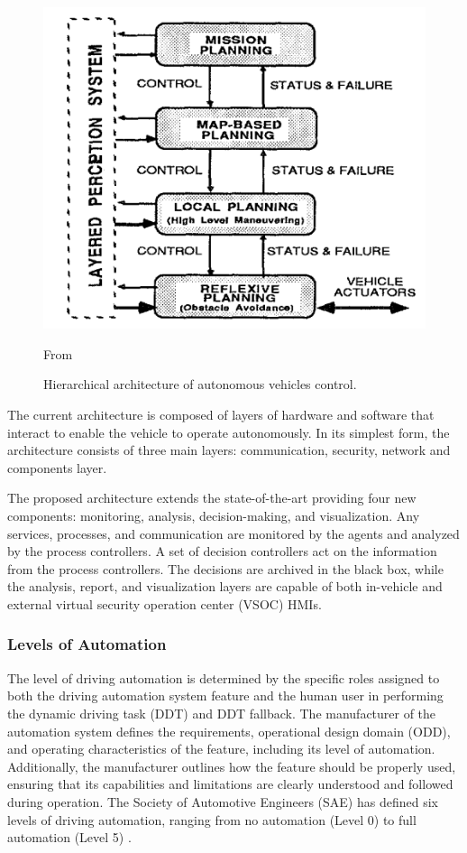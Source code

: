 \begin{figure}[!htb]
    \centering
    \includegraphics[width=0.7\linewidth]{figures/state-architecture}
    \caption{Hierarchical architecture of autonomous vehicles control.}
    \footnotesize{From \cite{architecture} }
    \label{fig:architecture}
\end{figure}

The current architecture is composed of layers of hardware and software that interact to enable the vehicle to operate autonomously.
In its simplest form, the architecture consists of three main layers: communication, security, network and components layer.

The proposed architecture extends the state-of-the-art providing four new components: monitoring, analysis, decision-making, and visualization.
Any services, processes, and communication are monitored
by the agents and analyzed by the process controllers.
A set of decision controllers act
on the information from the process controllers.
The decisions are archived in the black
box, while the analysis, report, and visualization layers are capable of both in-vehicle and
external virtual security operation center (VSOC) HMIs.


\subsubsection{Levels of Automation}\label{subsubsec:levels-of-automation}
The level of driving automation is determined by the specific roles assigned to both the driving automation system feature and the human user in performing the dynamic driving task (DDT) and DDT fallback. \cite{sae_j3016_2021}
The manufacturer of the automation system defines the requirements, operational design domain (ODD), and operating characteristics of the feature, including its level of automation.
Additionally, the manufacturer outlines how the feature should be properly used, ensuring that its capabilities and limitations are clearly understood and followed during operation.
The Society of Automotive Engineers (SAE) has defined six levels of driving automation, ranging from no automation (Level 0) to full automation (Level 5) \cite{sae_j3016_2021}.

